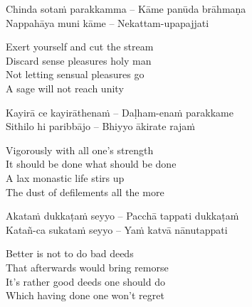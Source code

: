 \begin{leader}
\end{leader}

\begin{twochants}
  Chinda sotaṁ parakkamma – Kāme panūda brāhmaṇa\\
  Nappahāya muni kāme – Nekattam-upapajjati\\
\end{twochants}

\begin{english}
  Exert yourself and cut the stream\\
  Discard sense pleasures holy man\\
  Not letting sensual pleasures go\\
  A sage will not reach unity
\end{english}

\begin{twochants}
  Kayirā ce kayirāthenaṁ – Daḷham-enaṁ parakkame\\
  Sithilo hi paribbājo – Bhiyyo ākirate rajaṁ\\
\end{twochants}

\begin{english}
  Vigorously with all one’s strength\\
  It should be done what should be done\\
  A lax monastic life stirs up\\
  The dust of defilements all the more
\end{english}

\begin{twochants}
  Akataṁ dukkaṭaṁ seyyo – Pacchā tappati dukkaṭaṁ\\
  Katañ-ca sukataṁ seyyo – Yaṁ katvā nānutappati\\
\end{twochants}

\begin{english}
  Better is not to do bad deeds\\
  That afterwards would bring remorse\\
  It’s rather good deeds one should do\\
  Which having done one won’t regret
\end{english}

